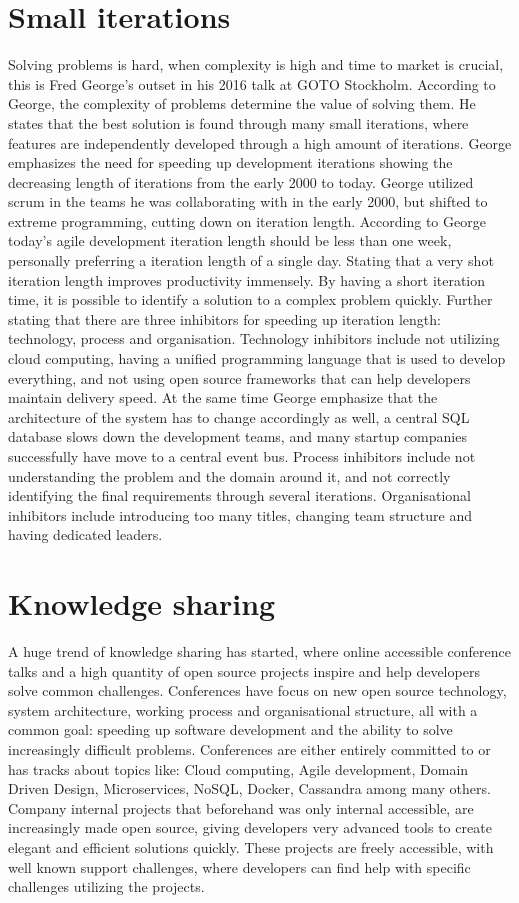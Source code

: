 \section{Small iterations}
Solving problems is hard, when complexity is high and time to market is crucial, this is Fred George's outset in his 2016 talk at GOTO Stockholm\cite{george2016it}. According to George, the complexity of problems determine the value of solving them. He states that the best solution is found through many small iterations, where features are independently developed through a high amount of iterations. George emphasizes the need for speeding up development iterations showing the decreasing length of iterations from the early 2000 to today. George utilized scrum in the teams he was collaborating with in the early 2000, but shifted to extreme programming, cutting down on iteration length. According to George today's agile development iteration length should be less than one week, personally preferring a iteration length of a single day. Stating that a very shot iteration length improves productivity immensely. By having a short iteration time, it is possible to identify a solution to a complex problem quickly. Further stating that there are three inhibitors for speeding up iteration length: technology, process and organisation. Technology inhibitors include not utilizing cloud computing, having a unified programming language that is used to develop everything, and not using open source frameworks that can help developers maintain delivery speed. At the same time George emphasize that the architecture of the system has to change accordingly as well, a central SQL database slows down the development teams, and many startup companies successfully have move to a central event bus. Process inhibitors include not understanding the problem and the domain around it, and not correctly identifying the final requirements through several iterations. Organisational inhibitors include introducing too many titles, changing team structure and having dedicated leaders.


\section{Knowledge sharing}
A huge trend of knowledge sharing has started, where online accessible conference talks and a high quantity of open source projects inspire and help developers solve common challenges. Conferences have focus on new open source technology, system architecture, working process and organisational structure, all with a common goal: speeding up software development and the ability to solve increasingly difficult problems. Conferences are either entirely committed to or has tracks about topics like: Cloud computing, Agile development, Domain Driven Design, Microservices, NoSQL, Docker, Cassandra among many others. Company internal projects that beforehand was only internal accessible, are increasingly made open source, giving developers very advanced tools to create elegant and efficient solutions quickly. These projects are freely accessible, with well known support challenges, where developers can find help with specific challenges utilizing the projects.

